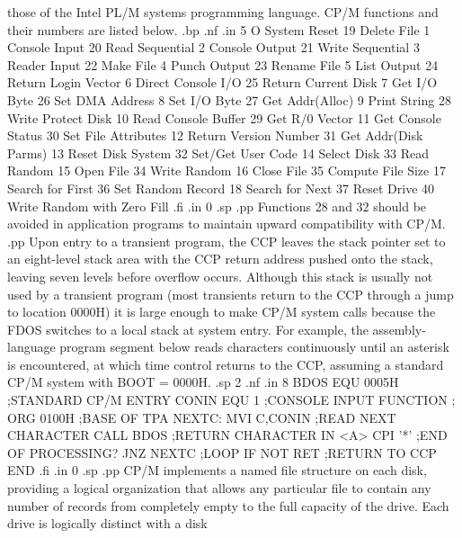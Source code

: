 those of the Intel PL/M systems programming language.  CP/M functions and 
their numbers are listed below.
.bp
.nf
.in 5
 O  System Reset             19  Delete File
 1  Console Input            20  Read Sequential
 2  Console Output           21  Write Sequential
 3  Reader Input             22  Make File
 4  Punch Output             23  Rename File
 5  List Output              24  Return Login Vector
 6  Direct Console I/O       25  Return Current Disk
 7  Get I/O Byte             26  Set DMA Address
 8  Set I/O Byte             27  Get Addr(Alloc)
 9  Print String             28  Write Protect Disk
10  Read Console Buffer      29  Get R/0 Vector
11  Get Console Status       30  Set File Attributes
12  Return Version Number    31  Get Addr(Disk Parms)
13  Reset Disk System        32  Set/Get User Code
14  Select Disk              33  Read Random
15  Open File                34  Write Random
16  Close File               35  Compute File Size
17  Search for First         36  Set Random Record
18  Search for Next          37  Reset Drive
                             40  Write Random with Zero Fill
.fi
.in 0
.sp 
.pp
Functions 28 and 32 should be avoided in application programs to 
maintain upward compatibility with CP/M.
.pp
Upon entry to a transient program, the CCP leaves the stack 
pointer set to an eight-level stack area with the CCP return 
address pushed onto the stack, leaving seven levels before 
overflow occurs.  Although this stack is usually not used by a 
transient program (most transients return to the CCP 
through a jump to location 0000H) it is large enough to 
make CP/M system calls because the FDOS switches to a local stack 
at system entry.  For example, the assembly-language program segment below 
reads characters continuously until an asterisk is 
encountered, at which time control returns to the CCP, assuming a 
standard CP/M system with BOOT = 0000H.
.sp 2
.nf
.in 8
BDOS      EQU        0005H      ;STANDARD CP/M ENTRY
CONIN     EQU        1          ;CONSOLE INPUT FUNCTION
;
          ORG        0100H      ;BASE OF TPA
NEXTC:    MVI        C,CONIN    ;READ NEXT CHARACTER
          CALL       BDOS       ;RETURN CHARACTER IN <A>
          CPI        '*'        ;END OF PROCESSING?
          JNZ        NEXTC      ;LOOP IF NOT
          RET                   ;RETURN TO CCP
          END
.fi
.in 0
.sp 
.pp
CP/M implements a named file structure on each disk, providing a 
logical organization that allows any particular file to contain 
any number of records from completely empty to the full capacity 
of the drive.  Each drive is logically distinct with a disk 
